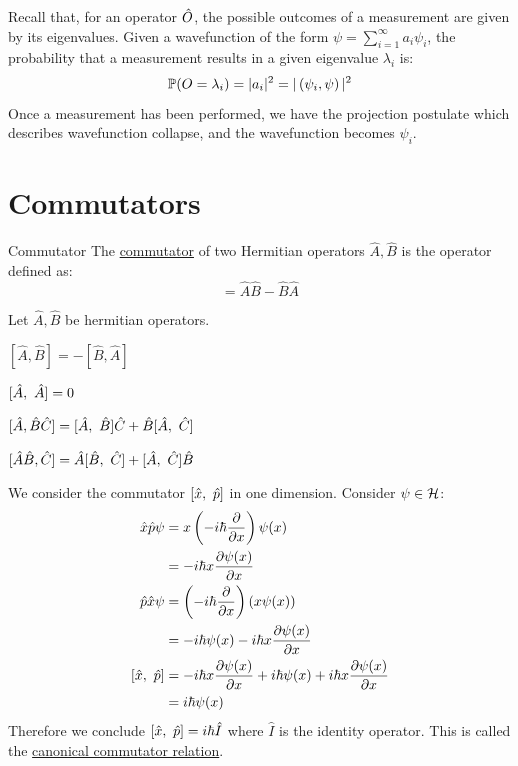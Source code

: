 \documentclass[../Main.tex]{subfiles}
\begin{document}
Recall that, for an operator $\hat{O}$, the possible outcomes of a measurement are given by its eigenvalues. Given a wavefunction of the form $\psi = \sum_{i=1}^{\infty} a_i \psi_i$, the probability that a measurement results in a given eigenvalue $\lambda_i$ is:
\begin{equation*}
    \mathbb{P}(O = \lambda_i) = |a_i|^2 = |\left(\psi_i,\psi\right)|^2
\end{equation*}
Once a measurement has been performed, we have the projection postulate which describes wavefunction collapse, and the wavefunction becomes $\psi_i$.
\section{Commutators}
\begin{definition}{Commutator}
    The \underline{commutator} of two Hermitian operators $\hat{A}, \hat{B}$ is the operator defined as:
    \begin{equation*}
        [\hat{A}, \hat{B}] = \hat{A}\hat{B} - \hat{B}\hat{A}
    \end{equation*}
\end{definition}
\begin{propositions}{
        Let $\hat{A}, \hat{B}$ be hermitian operators.
        \label{propsCommutator}
    }
    \item $[\hat{A}, \hat{B}] = -[\hat{B}, \hat{A}]$
    \item $[\hat{A},~\hat{A}] = 0$
    \item $[\hat{A}, \hat{B}\hat{C}] = [\hat{A},~\hat{B}]\hat{C} + \hat{B} [\hat{A},~\hat{C}]$
    \item $[\hat{A}\hat{B}, \hat{C}] = \hat{A}[\hat{B},~\hat{C}] + [\hat{A},~\hat{C}]\hat{B}$
\end{propositions}
\begin{example}
    We consider the commutator $[\hat{x},~\hat{p}]$ in one dimension. Consider $\psi \in \mathcal{H}$:
    \begin{align*}
        \hat{x} \hat{p} \psi &= x\left(-i\hbar \frac{\partial }{\partial x}\right)\psi(x) \\
        &= -i\hbar x \frac{\partial \psi(x)}{\partial x} \\
        \hat{p} \hat{x} \psi &= \left(-i\hbar \frac{\partial }{\partial x}\right) \left(x \psi(x)\right) \\
        &= -i\hbar \psi(x) - i\hbar x \frac{\partial \psi(x)}{\partial x} \\
        \cmmt{x}{p} &= -i\hbar x \frac{\partial \psi(x) }{\partial x} + i \hbar \psi(x) + i \hbar x \frac{\partial \psi(x)}{\partial x} \\
        &= i \hbar \psi(x)
    \end{align*}
    Therefore we conclude $[\hat{x},~\hat{p}] = i\hbar \hat{I}$ where $\hat{I}$ is the identity operator. This is called the \underline{canonical commutator relation}.
\end{example}
\end{document}
